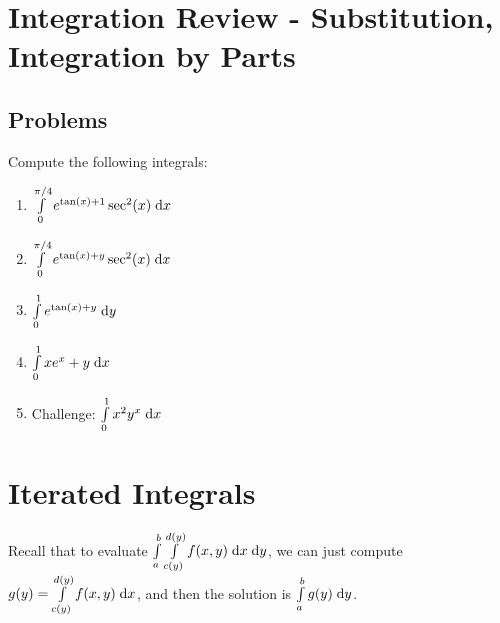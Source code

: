 \documentclass[letterpaper,11pt]{article}
\begin{document}
\section*{Integration Review - Substitution, Integration by Parts}
  \subsection*{Problems}
  Compute the following integrals:
  \begin{enumerate}
    \item $\int \limits_{0}^{\pi / 4} e^{\tan(x) + 1} \sec^2(x) \;\mathrm{d}x$\\
      \newline
      \newline

    \item $\int \limits_{0}^{\pi / 4} e^{\tan(x) + y} \sec^2(x) \;\mathrm{d}x$\\
      \newline
      \newline

    \item $\int \limits_{0}^{1} e^{\tan(x) + y} \;\mathrm{d}y$\\
      \newline
      \newline

    \item $\int \limits_{0}^{1} x e^{x} + y \;\mathrm{d}x$\\
      \newline
      \newline

    \item Challenge: $\int \limits_{0}^{1} x^2 y^{x} \;\mathrm{d}x$\\
      \newline
      \newline
  \end{enumerate}

\section*{Iterated Integrals}
  Recall that to evaluate $\int \limits_{a}^{b} \int \limits_{c(y)}^{d(y)} f(x, y) \;\mathrm{d}x \;\mathrm{d}y$,
  we can just compute $g(y) = \int \limits_{c(y)}^{d(y)} f(x, y) \;\mathrm{d}x$, and then the solution is $\int \limits_{a}^{b} g(y) \;\mathrm{d}y$.
\end{document}
